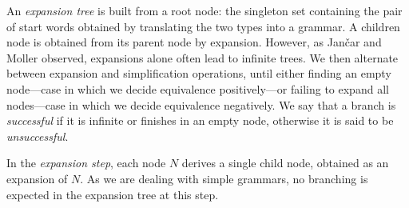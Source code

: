 An \emph{expansion tree} is built from a root node: the singleton set
containing the pair of start words obtained by translating the two
types into a grammar. A children node is obtained from its parent
node by expansion. However, as Jan{\v{c}}ar and Moller observed, expansions
alone often lead to infinite trees. We then alternate between
expansion and simplification operations, until either finding an empty
node---case in which we decide equivalence positively---or failing to
expand all nodes---case in which we decide equivalence negatively.
%
%
We say that a branch is \emph{successful} if it is infinite or
finishes in an empty node, otherwise it is said to be
\emph{unsuccessful}.

In the \emph{expansion step}, each node $N$ derives a single child
node, obtained as an expansion of $N$. As we are dealing with simple
grammars, no branching is expected in the expansion tree at this
step.
%

